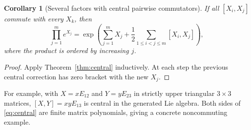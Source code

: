 \documentclass[11pt]{article}
\newtheorem{corollary}[theorem]{Corollary}
\theoremstyle{definition}
\theoremstyle{remark}
\numberwithin{equation}{section}
\begin{document}
\begin{corollary}[Several factors with central pairwise commutators]\label{cor:centralmany}
If all $[X_i,X_j]$ commute with every $X_k$, then
\begin{equation}\label{eq:centralmany}
 \prod_{j=1}^{m}e^{X_j}
 =\exp\left(\sum_{j=1}^{m}X_j+
                 \frac12\sum_{1\leq i<j\leq m}[X_i,X_j]\right),
\end{equation}
where the product is ordered by increasing $j$.
\end{corollary}
\begin{proof}
Apply Theorem~\ref{thm:central} inductively. At each step the previous central correction has zero bracket with the new $X_j$.
\end{proof}
For example, with $X=xE_{12}$ and $Y=yE_{23}$ in strictly upper triangular $3\times3$ matrices, $[X,Y]=xyE_{13}$ is central in the generated Lie algebra. Both sides of \eqref{eq:central} are finite matrix polynomials, giving a concrete noncommuting example.
\end{document}
